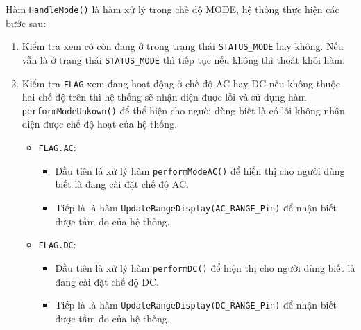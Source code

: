 Hàm \texttt{HandleMode()} là hàm xử lý trong chế độ MODE, hệ thống thực hiện các bước sau:

\begin{enumerate}[label=Bước \arabic *:]
	\item Kiểm tra xem có còn đang ở trong trạng thái \texttt{STATUS\_MODE} hay không. Nếu vẫn là ở trạng thái \texttt{STATUS\_MODE} thì tiếp tục nếu không thì thoát khỏi hàm.
	\item Kiểm tra \texttt{FLAG} xem đang hoạt động ở chế độ AC hay DC nếu không thuộc hai chế độ trên thì hệ thống sẽ nhận diện được lỗi và sử dụng hàm \texttt{performModeUnkown()} để thể hiện cho người dùng biết là có lỗi không nhận diện được chế độ hoạt của hệ thống.
		\begin{itemize}[label=-]
			\item \texttt{FLAG.AC}:
				\begin{itemize}[label = +]
					\item Đầu tiên là xử lý hàm \texttt{performModeAC()} để hiển thị cho người dùng biết là đang cài đặt chế độ AC.
					\item Tiếp là là hàm \texttt{UpdateRangeDisplay(AC\_RANGE\_Pin)} để nhận biết được tầm đo của hệ thống.					
				\end{itemize}
			\item \texttt{FLAG.DC}:
				\begin{itemize}[label = +]
					\item Đầu tiên là xử lý hàm \texttt{performDC()} để hiện thị cho người dùng biết là đang cài đặt chế độ DC.
					\item Tiếp là là hàm \texttt{UpdateRangeDisplay(DC\_RANGE\_Pin)} để nhận biết được tầm đo của hệ thống.
				\end{itemize}
		\end{itemize}
\end{enumerate}

